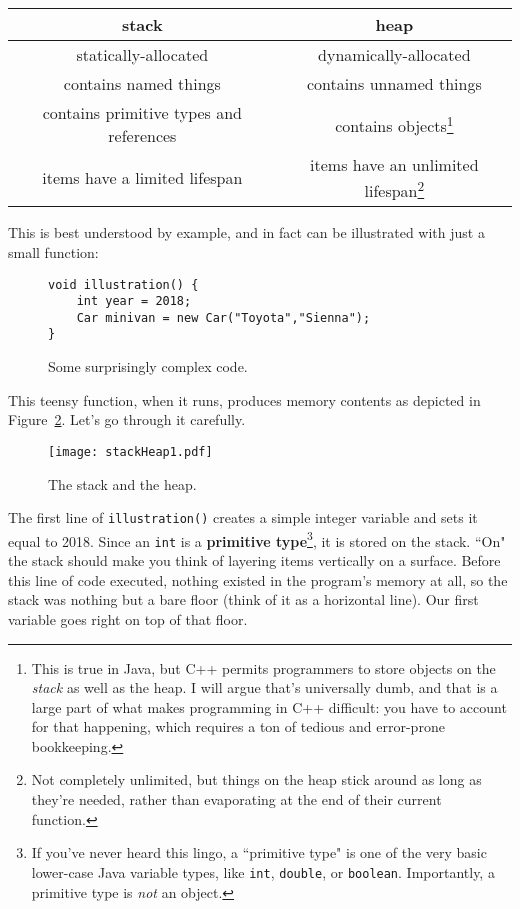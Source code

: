 \vspace{.2in}
\begin{tabular}{c|c}
\textbf{stack} & \textbf{heap} \\
\hline
statically-allocated & dynamically-allocated \\
contains named things & contains unnamed things \\
contains primitive types and references & contains objects\footnote{This is
true in Java, but C++ permits programmers to store objects on the
\textit{stack} as well as the heap. I will argue that's universally dumb, and
that is a large part of what makes programming in C++ difficult: you have to
account for that happening, which requires a ton of tedious and error-prone
bookkeeping.} \\
items have a limited lifespan & items have an unlimited lifespan\footnote{Not
completely unlimited, but things on the heap stick around as long as they're
needed, rather than evaporating at the end of their current function.} \\
\end{tabular}
\vspace{.2in}

This is best understood by example, and in fact can be illustrated with just a
small function:

\begin{figure}[ht]
\begin{Verbatim}[fontsize=\small,samepage=true,frame=single]
void illustration() {
    int year = 2018;
    Car minivan = new Car("Toyota","Sienna");
}
\end{Verbatim}
\caption{Some surprisingly complex code.}
\label{fig:firstCode}
\end{figure}

This teensy function, when it runs, produces memory contents as depicted in
Figure~\ref{fig:stackHeap1}. Let's go through it carefully.

\begin{figure}[ht]   %
\centering
\texttt{[image: stackHeap1.pdf]}
\caption{The stack and the heap.}
\label{fig:stackHeap1}
\end{figure}

The first line of \texttt{illustration()} creates a simple integer variable
and sets it equal to 2018. Since an \texttt{int} is a \textbf{primitive
type}\footnote{If you've never heard this lingo, a ``primitive type" is one of
the very basic lower-case Java variable types, like \texttt{int},
\texttt{double}, or \texttt{boolean}. Importantly, a primitive type is
\textit{not} an object.}, it is stored on the stack. ``On" the stack should
make you think of layering items vertically on a surface. Before this line of
code executed, nothing existed in the program's memory at all, so the stack
was nothing but a bare floor (think of it as a horizontal line). Our first
variable goes right on top of that floor.

